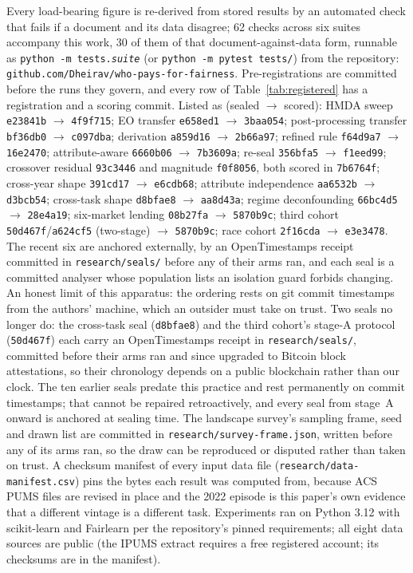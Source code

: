 \documentclass[9pt,conference]{IEEEtran}
\begin{document}
Every load-bearing figure is re-derived from stored results by an automated check that fails if
a document and its data disagree; 62 checks across six suites accompany this work, 30 of them
of that document-against-data form, runnable as
\texttt{python -m tests.\emph{suite}} (or \texttt{python -m pytest tests/}) from the
repository:
\texttt{github.com/Dheirav/who-pays-for-fairness}. Pre-registrations are committed before
the runs they govern, and every row of Table~\ref{tab:registered} has a registration and a
scoring commit. Listed as (sealed $\to$ scored): HMDA sweep \texttt{e23841b} $\to$
\texttt{4f9f715}; EO transfer \texttt{e658ed1} $\to$ \texttt{3baa054}; post-processing
transfer \texttt{bf36db0} $\to$ \texttt{c097dba}; derivation \texttt{a859d16} $\to$
\texttt{2b66a97}; refined rule \texttt{f64d9a7} $\to$ \texttt{16e2470}; attribute-aware
\texttt{6660b06} $\to$ \texttt{7b3609a}; re-seal \texttt{356bfa5} $\to$ \texttt{f1eed99};
crossover residual \texttt{93c3446} and magnitude \texttt{f0f8056}, both scored in
\texttt{7b6764f}; cross-year shape \texttt{391cd17} $\to$ \texttt{e6cdb68}; attribute
independence \texttt{aa6532b} $\to$ \texttt{d3bcb54}; cross-task shape
\texttt{d8bfae8} $\to$ \texttt{aa8d43a}; regime deconfounding \texttt{66bc4d5}
$\to$ \texttt{28e4a19}; six-market lending \texttt{08b27fa} $\to$ \texttt{5870b9c};
third cohort \texttt{50d467f}/\texttt{a624cf5} (two-stage) $\to$ \texttt{5870b9c};
race cohort \texttt{2f16cda} $\to$ \texttt{e3e3478}. The recent six are anchored
externally, by an OpenTimestamps receipt committed in \texttt{research/seals/} before any of
their arms ran, and each seal is a committed analyser whose population lists an isolation
guard forbids changing. An honest limit of this
apparatus: the ordering rests on git commit timestamps from the authors' machine, which
an outsider must take on trust. Two seals no longer do: the cross-task seal
(\texttt{d8bfae8}) and the third cohort's stage-A protocol (\texttt{50d467f}) each carry
an OpenTimestamps receipt in \texttt{research/seals/}, committed before their arms ran
and since upgraded to Bitcoin block attestations, so their chronology depends on a public
blockchain rather than our clock. The ten earlier seals predate this practice and rest
permanently on commit timestamps; that cannot be repaired retroactively, and every seal
from stage~A onward is anchored at sealing time. The landscape survey's sampling frame, seed and drawn list are committed in
\texttt{research/survey-frame.json}, written before any of its arms ran, so the draw can
be reproduced or disputed rather than taken on trust. A checksum manifest of every input data file
(\texttt{research/data-manifest.csv}) pins the bytes each result was computed from,
because ACS PUMS files are revised in place and the 2022 episode is this paper's own
evidence that a different vintage is a different task.
Experiments ran on Python 3.12 with scikit-learn and Fairlearn per the repository's pinned
requirements; all eight data sources are public (the IPUMS extract requires a free
registered account; its checksums are in the manifest).
\end{document}
